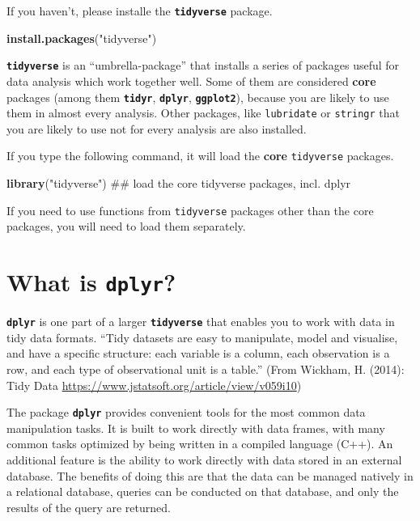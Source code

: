 \documentclass[]{book}
\newenvironment{Shaded}{\begin{snugshade}}{\end{snugshade}}
\newcommand{\KeywordTok}[1]{\textcolor[rgb]{0.13,0.29,0.53}{\textbf{#1}}}
\newcommand{\StringTok}[1]{\textcolor[rgb]{0.31,0.60,0.02}{#1}}
\newcommand{\NormalTok}[1]{#1}
\theoremstyle{definition}
\theoremstyle{definition}
\theoremstyle{definition}
\theoremstyle{remark}
\begin{document}
If you haven't, please installe the \textbf{\texttt{tidyverse}} package.

\begin{Shaded}
\begin{Highlighting}[]
\KeywordTok{install.packages}\NormalTok{(}\StringTok{"tidyverse"}\NormalTok{)    }
\end{Highlighting}
\end{Shaded}

\textbf{\texttt{tidyverse}} is an ``umbrella-package'' that installs a
series of packages useful for data analysis which work together well.
Some of them are considered \textbf{core} packages (among them
\textbf{\texttt{tidyr}}, \textbf{\texttt{dplyr}},
\textbf{\texttt{ggplot2}}), because you are likely to use them in almost
every analysis. Other packages, like \texttt{lubridate} or
\texttt{stringr} that you are likely to use not for every analysis are
also installed.

If you type the following command, it will load the \textbf{core}
\texttt{tidyverse} packages.

\begin{Shaded}
\begin{Highlighting}[]
\KeywordTok{library}\NormalTok{(}\StringTok{"tidyverse"}\NormalTok{)    ## load the core tidyverse packages, incl. dplyr}
\end{Highlighting}
\end{Shaded}

If you need to use functions from \texttt{tidyverse} packages other than
the core packages, you will need to load them separately.

\section{\texorpdfstring{What is
\textbf{\texttt{dplyr}}?}{What is dplyr?}}\label{what-is-dplyr}

\textbf{\texttt{dplyr}} is one part of a larger
\textbf{\texttt{tidyverse}} that enables you to work with data in tidy
data formats. ``Tidy datasets are easy to manipulate, model and
visualise, and have a specific structure: each variable is a column,
each observation is a row, and each type of observational unit is a
table.'' (From Wickham, H. (2014): Tidy Data
\url{https://www.jstatsoft.org/article/view/v059i10})

The package \textbf{\texttt{dplyr}} provides convenient tools for the
most common data manipulation tasks. It is built to work directly with
data frames, with many common tasks optimized by being written in a
compiled language (C++). An additional feature is the ability to work
directly with data stored in an external database. The benefits of doing
this are that the data can be managed natively in a relational database,
queries can be conducted on that database, and only the results of the
query are returned.
\end{document}
